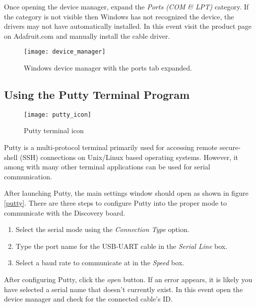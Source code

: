 \documentclass[openany,11pt,fleqn]{book} %
\begin{document}
Once opening the device manager, expand the \textit{Ports (COM \& LPT)} category. If the category is not visible then Windows has not recognized the device, the drivers may not have automatically installed. In this event visit the product page on Adafruit.com and manually install the cable driver.  
\begin{figure}[]
    \centering\texttt{[image: device\_manager]}
    \caption{Windows device manager with the ports tab expanded.}
    \label{device_manager}
\end{figure}

\subsection{Using the Putty Terminal Program}


\begin{wrapfigure}[8]{h!R}{0.2\textwidth}
    \centering\texttt{[image: putty\_icon]}
    \caption{Putty terminal icon}
    \label{uvision_logo}
\end{wrapfigure}

Putty is a multi-protocol terminal primarily used for accessing remote secure-shell (SSH) connections on Unix/Linux based operating systems. However, it among with many other terminal applications can be used for serial communication.

After launching Putty, the main settings window should open as shown in figure \ref{putty}. There are three steps to configure Putty into the proper mode to communicate with the Discovery board. 
\begin{enumerate}
    \item Select the serial mode using the \textit{Connection Type} option. 
    \item Type the port name for the USB-UART cable in the \textit{Serial Line} box.
    \item Select a baud rate to communicate at in the \textit{Speed} box.
\end{enumerate}

After configuring Putty, click the \textit{open} button. If an error appears, it is likely you have selected a serial name that doesn't currently exist. In this event open the device manager and check for the connected cable's ID. 
\end{document}
